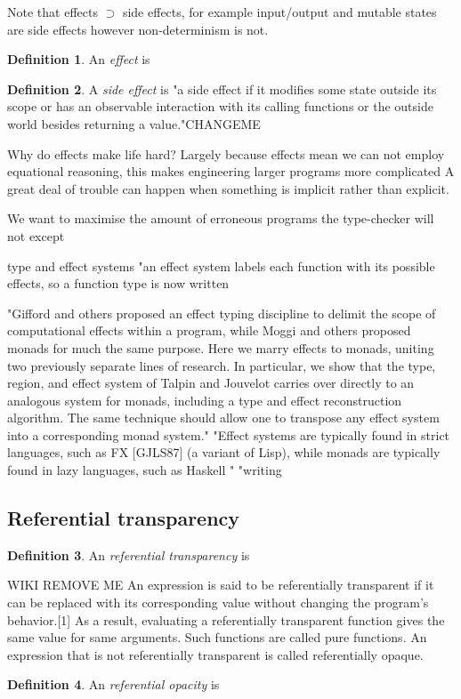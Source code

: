 \documentclass[a4paper,10pt]{article}
\theoremstyle{definition}
\newtheorem{definition}{Definition}[section]
\begin{document}
Note that effects $\supset$ side effects,
for example input/output and mutable states are side effects
however non-determinism is not.
\begin{definition}
    An \textit{effect} is
\end{definition}

\begin{definition}
    A \textit{side effect} is
"a side effect if it modifies some state outside its scope or has an observable interaction with its calling functions or the outside world besides returning a value."CHANGEME
\cite{hughes1989functional}
\end{definition}

Why do effects make life hard?
Largely because effects mean we can not employ equational reasoning,
this makes engineering larger programs more complicated
A great deal of trouble can happen when something is implicit
rather than explicit.

We want to maximise the amount of erroneous programs the type-checker will not except

type and effect systems
\cite{nielson1999type}
"an effect system labels each function with its possible effects, so a function type is now written %

"Gifford and others proposed an effect typing discipline to delimit the scope of computational effects within a program, while Moggi and others proposed monads for much the same purpose. Here we marry effects to monads, uniting two previously separate lines of research. In particular, we show that the type, region, and effect system of Talpin and Jouvelot carries over directly to an analogous system for monads, including a type and effect reconstruction algorithm. The same technique should allow one to transpose any effect system into a corresponding monad system."
"Effect systems are typically found in strict languages, such as FX [GJLS87] (a variant of Lisp), while monads are typically found in lazy languages, such as Haskell "
"writing %
\cite{wadler2003marriage}

\subsection{Referential transparency}
\begin{definition}
    An \textit{referential transparency} is
\end{definition}
WIKI REMOVE ME
An expression is said to be referentially transparent if it can be replaced with its corresponding value without changing the program's behavior.[1] As a result, evaluating a referentially transparent function gives the same value for same arguments. Such functions are called pure functions. An expression that is not referentially transparent is called referentially opaque.
\begin{definition}
    An \textit{referential opacity} is
\end{definition}
\end{document}
